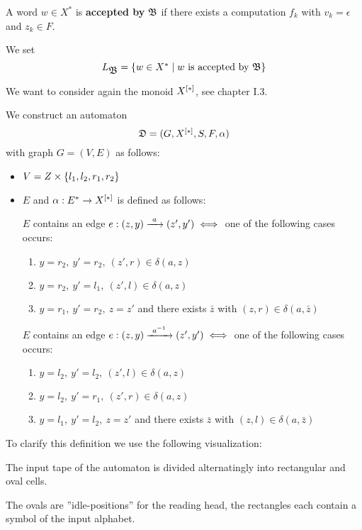 \bigskip
\begin{definition}
A word $w \in X^*$ is {\bf accepted by} $\mbox{$\mathfrak{B}$}$ if there exists a computation
$f_k$ with $v_k = \epsilon$ and $z_k \in F$.
\end{definition}

We set
\[ L_{\mbox{$\mathfrak{B}$}} = \mbox{$\{w \in X^* \mid w\text{ is accepted by }\mbox{$\mathfrak{B}$}\}$} \]

We want to consider again the monoid $\mbox{${X}^{[*]}$}$, see chapter I.3.

We construct an automaton
\[ \mbox{$\mathfrak{D}$} = (G, \mbox{${X}^{[*]}$}, S, F, \alpha) \]
with graph $G=(V, E)$ as follows:
\begin{itemize}
  \item $V = Z \times \mbox{$\{l_1, l_2, r_1, r_2\}$}$
  \item $E$ and $\alpha: E^* \to \mbox{${X}^{[*]}$}$ is defined as follows:
  
  $E$ contains an edge $e: (z, y) \xrightarrow{\ {a}\ } (z', y') \iff$ one of the following
  cases occurs:
  \begin{enumerate}
    \item $y = r_2,\ y' = r_2,\ (z', r) \in \delta(a, z)$
    \item $y = r_2,\ y' = l_1,\ (z', l) \in \delta(a, z)$
    \item $y = r_1,\ y' = r_2,\ z = z'$ and there exists $\bar{z}$ with $(z, r)
    \in \delta(a, \bar{z})$
  \end{enumerate}

  $E$ contains an edge $e: (z, y) \xrightarrow{\ {{{a}^{-1}}}\ } (z', y') \iff$ one of the
  following cases occurs:
  \begin{enumerate}
    \item $y = l_2,\ y' = l_2,\ (z', l) \in \delta(a, z)$
    \item $y = l_2,\ y' = r_1,\ (z', r) \in \delta(a, z)$
    \item $y = l_1,\ y' = l_2,\ z = z'$ and there exists $\bar{z}$ with $(z, l)
    \in \delta(a, \bar{z})$
  \end{enumerate}
\end{itemize}

\bigskip
To clarify this definition we use the following visualization:

The input tape of the automaton is divided alternatingly into rectangular and
oval cells.

\missingfigure

The ovals are ''idle-positions'' for the reading head, the rectangles
each contain a symbol of the input alphabet.

